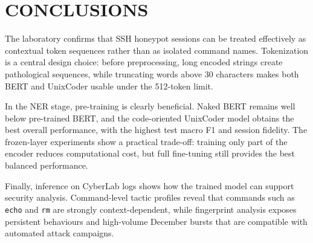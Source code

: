 
\section{CONCLUSIONS} \label{sec:conclusions}

The laboratory confirms that SSH honeypot sessions can be treated effectively
as contextual token sequences rather than as isolated command names.
Tokenization is a central design choice: before preprocessing, long encoded
strings create pathological sequences, while truncating words above 30
characters makes both BERT and UnixCoder usable under the 512-token limit.

In the NER stage, pre-training is clearly beneficial. Naked BERT remains well
below pre-trained BERT, and the code-oriented UnixCoder model obtains the best
overall performance, with the highest test macro F1 and session fidelity. The
frozen-layer experiments show a practical trade-off: training only part of the
encoder reduces computational cost, but full fine-tuning still provides the
best balanced performance.

Finally, inference on CyberLab logs shows how the trained model can support
security analysis. Command-level tactic profiles reveal that commands such as
\texttt{echo} and \texttt{rm} are strongly context-dependent, while fingerprint
analysis exposes persistent behaviours and high-volume December bursts that
are compatible with automated attack campaigns.

